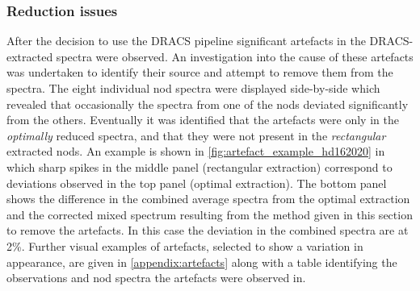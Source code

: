 
\subsubsection{Reduction issues}
\label{subsubsec:reductionartefacts}
After the decision to use the {DRACS} pipeline significant artefacts in the {DRACS}-extracted spectra were observed.
An investigation into the cause of these artefacts was undertaken to identify their source and attempt to remove them from the spectra.
The eight individual nod spectra were displayed side-by-side which revealed that occasionally the spectra from one of the nods deviated significantly from the others.
Eventually it was identified that the artefacts were only in the \emph{optimally} reduced spectra, and that they were not present in the \emph{rectangular} extracted nods.
An example is shown in \cref{fig:artefact_example_hd162020} in which sharp spikes in the middle panel (rectangular extraction) correspond to deviations observed in the top panel (optimal extraction).
The bottom panel shows the difference in the combined average spectra from the optimal extraction and the corrected mixed spectrum resulting from the method given in this section to remove the artefacts.
In this case the deviation in the combined spectra are at 2\%.
Further visual examples of artefacts, selected to show a variation in appearance, are given in \cref{appendix:artefacts} along with a table identifying the observations and nod spectra the artefacts were observed in.

